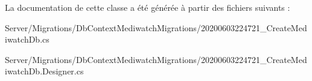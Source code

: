 La documentation de cette classe a été générée à partir des fichiers suivants \+:\begin{DoxyCompactItemize}
\item 
Server/\+Migrations/\+Db\+Context\+Mediwatch\+Migrations/20200603224721\+\_\+\+Create\+Mediwatch\+Db.\+cs\item 
Server/\+Migrations/\+Db\+Context\+Mediwatch\+Migrations/20200603224721\+\_\+\+Create\+Mediwatch\+Db.\+Designer.\+cs\end{DoxyCompactItemize}
